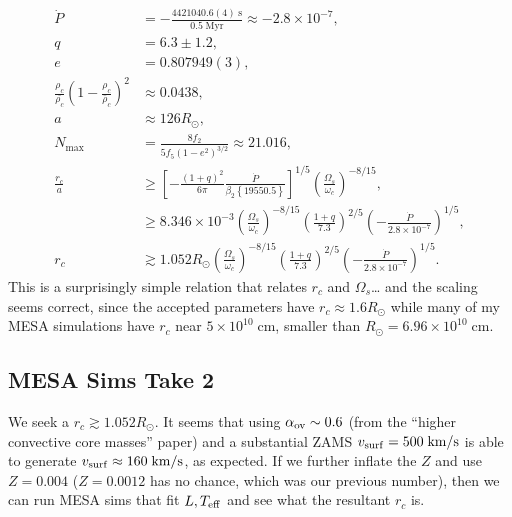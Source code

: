 \documentclass[11pt,
        usenames, %
        dvipsnames %
    ]{article}
\newcommand*{\scinot}[2]{#1\times10^{#2}}
\newcommand*{\p}[1]{\left(#1\right)}
\newcommand*{\s}[1]{\left[#1\right]}
\newcommand*{\z}[1]{\left\{#1\right\}}
\begin{document}
\begin{align}
    \dot{P} &= -\frac{4421040.6(4)\;\mathrm{s}}{0.5\;\mathrm{Myr}}
        \approx -\scinot{2.8}{-7},\\
    q &= 6.3 \pm 1.2,\\
    e &= 0.807949(3),\\
    \frac{\rho_c}{\bar{\rho_c}} \p{1 - \frac{\rho_c}{\bar{\rho}_c}}^2
            &\approx 0.0438,\\
    a &\approx 126R_{\odot},\\
    N_{\max} &= \frac{8f_2}{5f_5\p{1 - e^2}^{3/2}}
        \approx 21.016,\\
    \frac{r_c}{a} &\geq
            \s{-\frac{(1 + q)^2}{6\pi}
                \frac{\dot{P}}{\beta_2\z{19550.5}}}^{1/5}
                \p{\frac{\Omega_s}{\omega_c}}^{-8/15},\\
        &\geq \scinot{8.346}{-3}\p{\frac{\Omega_s}{\omega_c}}^{-8/15}
            \p{\frac{1 + q}{7.3}}^{2/5}
            \p{-\frac{\dot{P}}{\scinot{2.8}{-7}}}^{1/5},\\
    r_c &\gtrsim 1.052R_{\odot}\p{\frac{\Omega_s}{\omega_c}}^{-8/15}
        \p{\frac{1 + q}{7.3}}^{2/5}\p{-\frac{\dot{P}}{\scinot{2.8}{-7}}}^{1/5}.
\end{align}
This is a surprisingly simple relation that relates $r_c$ and $\Omega_s$\dots
and the scaling seems correct, since the accepted parameters have $r_c \approx
1.6R_{\odot}$ while many of my MESA simulations have $r_c$ near
$\scinot{5}{10}\;\mathrm{cm}$, smaller than $R_{\odot} =
\scinot{6.96}{10}\;\mathrm{cm}$.

\subsection{MESA Sims Take 2}

We seek a $r_c \gtrsim 1.052R_{\odot}$. It seems that using $\alpha_{\rm ov}
\sim 0.6$ (from the ``higher convective core masses'' paper) and a substantial
ZAMS $v_{\rm surf} = 500\;\mathrm{km/s}$ is able to generate $v_{\rm surf}
\approx 160\;\mathrm{km/s}$, as expected. If we further inflate the $Z$ and use
$Z = 0.004$ ($Z = 0.0012$ has no chance, which was our previous number), then we
can run MESA sims that fit $L, T_{\rm eff}$ and see what the resultant $r_c$ is.
\end{document}
